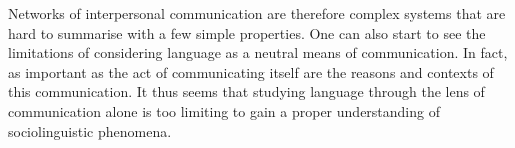 \documentclass[../thesis.tex]{subfiles}
\begin{document}
Networks of interpersonal communication are therefore complex systems that are hard to
summarise with a few simple properties. One can also start to see the limitations of
considering language as a neutral means of communication. In fact, as important as the
act of communicating itself are the reasons and contexts of this communication. It thus
seems that studying language through the lens of communication alone is too limiting to
gain a proper understanding of sociolinguistic phenomena.





\end{document}
